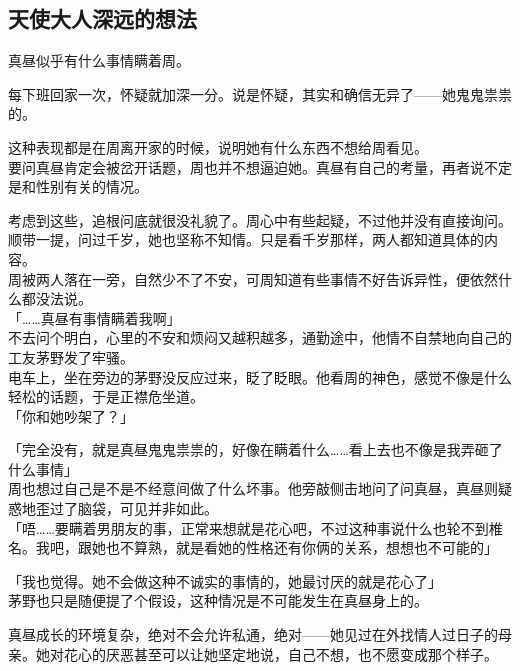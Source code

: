 \subsection{天使大人深远的想法}

真昼似乎有什么事情瞒着周。

每下班回家一次，怀疑就加深一分。说是怀疑，其实和确信无异了——她鬼鬼祟祟的。

这种表现都是在周离开家的时候，说明她有什么东西不想给周看见。\\

要问真昼肯定会被岔开话题，周也并不想逼迫她。真昼有自己的考量，再者说不定是和性别有关的情况。

考虑到这些，追根问底就很没礼貌了。周心中有些起疑，不过他并没有直接询问。\\

顺带一提，问过千岁，她也坚称不知情。只是看千岁那样，两人都知道具体的内容。\\

周被两人落在一旁，自然少不了不安，可周知道有些事情不好告诉异性，便依然什么都没法说。\\

「……真昼有事情瞒着我啊」\\

不去问个明白，心里的不安和烦闷又越积越多，通勤途中，他情不自禁地向自己的工友茅野发了牢骚。\\

电车上，坐在旁边的茅野没反应过来，眨了眨眼。他看周的神色，感觉不像是什么轻松的话题，于是正襟危坐道。\\

「你和她吵架了？」

「完全没有，就是真昼鬼鬼祟祟的，好像在瞒着什么……看上去也不像是我弄砸了什么事情」\\

周也想过自己是不是不经意间做了什么坏事。他旁敲侧击地问了问真昼，真昼则疑惑地歪过了脑袋，可见并非如此。\\

「唔……要瞒着男朋友的事，正常来想就是花心吧，不过这种事说什么也轮不到椎名。我吧，跟她也不算熟，就是看她的性格还有你俩的关系，想想也不可能的」

「我也觉得。她不会做这种不诚实的事情的，她最讨厌的就是花心了」\\

茅野也只是随便提了个假设，这种情况是不可能发生在真昼身上的。

真昼成长的环境复杂，绝对不会允许私通，绝对——她见过在外找情人过日子的母亲。她对花心的厌恶甚至可以让她坚定地说，自己不想，也不愿变成那个样子。\\

